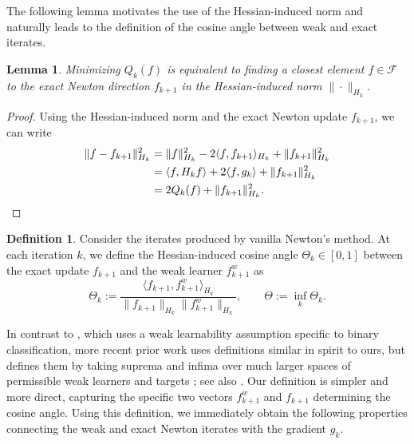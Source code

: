 \documentclass{article}
\theoremstyle{plain}
\newtheorem{lemma}[theorem]{Lemma}
\theoremstyle{definition}
\newtheorem{definition}[theorem]{Definition}
\theoremstyle{remark}
\begin{document}
The following lemma motivates the use of the Hessian-induced norm and naturally leads to the definition of the cosine angle between weak and exact iterates.

\begin{lemma}\label{lemmaVanillaNewtonClosestElement}
    Minimizing $Q_k(f)$ is equivalent to finding a closest element $f\in\mathcal{F}$ to the exact Newton direction $f_{k+1}$ in the Hessian-induced norm $\|\cdot\|_{H_k}$.
\end{lemma}
\begin{proof}
    Using the Hessian-induced norm and the exact Newton update $f_{k+1}$, we can write
    \begin{align*}
        \|f-f_{k+1}\|^2_{H_k}
        &= \|f\|_{H_k}^2 - 2\langle f, f_{k+1}\rangle_{H_k} + \| f_{k+1} \|_{H_k}^2 \\
        &= \langle f, H_k f\rangle + 2\langle f, g_k \rangle + \|f_{k+1}\|^2_{H_k} \\
        &= 2Q_k(f) + \|f_{k+1}\|^2_{H_k}. \qedhere
    \end{align*}
\end{proof}


\begin{definition}
    Consider the iterates produced by vanilla Newton's method. At each iteration $k$, we define the Hessian-induced cosine angle $\Theta_k \in [0, 1]$ between the exact update $f_{k+1}$ and the weak learner $f_{k+1}^w$ as
    \begin{equation}\label{eqHessianCosineAngle}
        \Theta_k := \frac{\langle f_{k+1}, f_{k+1}^w \rangle_{H_k}}{\|f_{k+1}\|_{H_k} \|f_{k+1}^w\|_{H_k}}, \qquad \Theta := \inf_k \Theta_k.
    \end{equation}
\end{definition}

In contrast to \citet{2014AConvergenceRateAnalysisForLogitBoostMARTAndTheirVariant}, which uses a weak learnability assumption specific to binary classification, more recent prior work uses definitions similar in spirit to ours, but defines them by taking suprema and infima over much larger spaces of permissible weak learners and targets \cite{2020RandomizedGradientBoostingMachine, 2020AcceleratingGradientBoostingMachines,2020SnapBoostAHeterogeneousBoostingMachine}; see also \cite{2011GeneralizedBoostingAlgorithmsForConvexOptimization}. Our definition is simpler and more direct, capturing the specific two vectors $f^w_{k+1}$ and $f_{k+1}$ determining the cosine angle. Using this definition, we immediately obtain the following properties connecting the weak and exact Newton iterates with the gradient $g_k$. 
\end{document}
